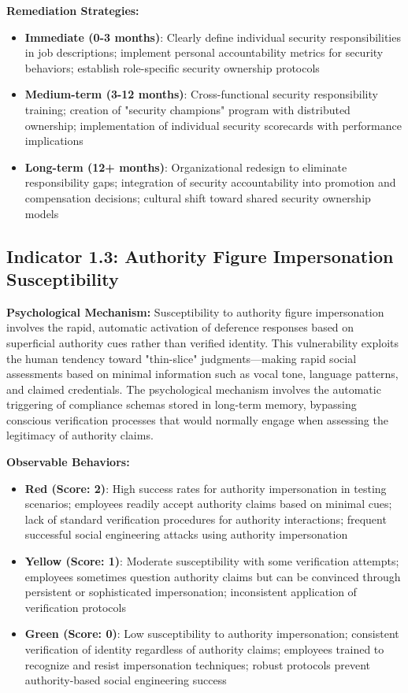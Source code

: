 \documentclass[11pt,a4paper]{article}
\begin{document}
\textbf{Remediation Strategies:}
\begin{itemize}
\item \textbf{Immediate (0-3 months)}: Clearly define individual security responsibilities in job descriptions; implement personal accountability metrics for security behaviors; establish role-specific security ownership protocols
\item \textbf{Medium-term (3-12 months)}: Cross-functional security responsibility training; creation of "security champions" program with distributed ownership; implementation of individual security scorecards with performance implications
\item \textbf{Long-term (12+ months)}: Organizational redesign to eliminate responsibility gaps; integration of security accountability into promotion and compensation decisions; cultural shift toward shared security ownership models
\end{itemize}

\subsection{Indicator 1.3: Authority Figure Impersonation Susceptibility}

\textbf{Psychological Mechanism:}
Susceptibility to authority figure impersonation involves the rapid, automatic activation of deference responses based on superficial authority cues rather than verified identity. This vulnerability exploits the human tendency toward "thin-slice" judgments—making rapid social assessments based on minimal information such as vocal tone, language patterns, and claimed credentials. The psychological mechanism involves the automatic triggering of compliance schemas stored in long-term memory, bypassing conscious verification processes that would normally engage when assessing the legitimacy of authority claims.

\textbf{Observable Behaviors:}
\begin{itemize}
\item \textbf{Red (Score: 2)}: High success rates for authority impersonation in testing scenarios; employees readily accept authority claims based on minimal cues; lack of standard verification procedures for authority interactions; frequent successful social engineering attacks using authority impersonation
\item \textbf{Yellow (Score: 1)}: Moderate susceptibility with some verification attempts; employees sometimes question authority claims but can be convinced through persistent or sophisticated impersonation; inconsistent application of verification protocols
\item \textbf{Green (Score: 0)}: Low susceptibility to authority impersonation; consistent verification of identity regardless of authority claims; employees trained to recognize and resist impersonation techniques; robust protocols prevent authority-based social engineering success
\end{itemize}
\end{document}
